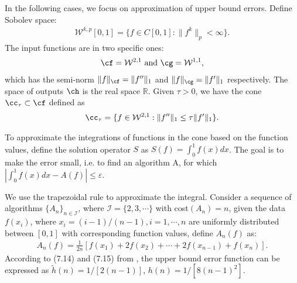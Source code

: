 
\newcommand{\R}{\mathbb{R}}
In the following cases, we focus on approximation of upper bound errors. Define Sobolev space:
\begin{align*}
  \mathcal{W}^{k,p}[0,1]=\{f\in C[0,1]: \|f^{k}\|_{p}<\infty\}.
\end{align*}
The input functions are in two specific ones:
\begin{align*}
  \cf=\mathcal{W}^{2,1} \text{ and }
  \cg=\mathcal{W}^{1,1},
\end{align*}
which has the semi-norm $\|f\|_{\cf}=\|f''\|_{1}$ and $\|f\|_{\cg}=\|f'\|_{1}$ respectively. The space of outputs $\ch$ is the real space $\R$. Given $\tau > 0$, we have the cone $\cc_{\tau} \subset \cf$ defined as
\begin{align}\label{coneinteg}
\cc_{\tau}=\{f\in \mathcal{W}^{2,1}:\|f''\|_1\leq\tau\|f'\|_1\}.
\end{align}

To approximate the integrations of functions in the cone based on the function values, define the solution operator $S$ as $S(f)=\int_{0}^{1}f(x)dx$. The goal is to make the error small, i.e. to find an algorithm A, for which $|\int_{0}^{1}f(x)dx-A(f)|\leq \varepsilon$.

We use the trapezoidal rule to approximate the integral. Consider a sequence of algorithms $\{A_n\}_{n\in \mathcal{I}}$, where $\mathcal{I}=\{2,3,\cdots\}$ with cost$(A_n)=n$, given the data $f(x_i)$, where $x_i=(i-1)/(n-1), i=1,\cdots,n$ are uniformly distributed between $[0,1]$ with corresponding function values, define $A_n(f)$ as: \begin{align*}
    A_{n}(f)
    =\frac{1}{2n}[f(x_1)+2f(x_2)+\cdots+2f(x_{n-1})+f(x_n)].
\end{align*}
According to (7.14) and (7.15) from \cite{BraPet11a}, the upper bound error function can be expressed as $\tilde{h}(n)=1/[2(n-1)]$, $h(n)=1/[8(n-1)^2]$.

